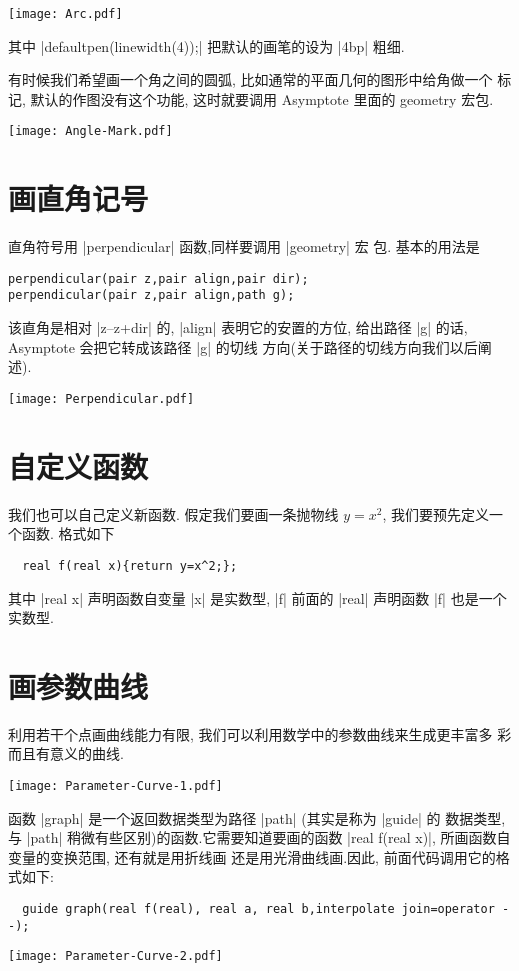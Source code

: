 \documentclass{ctexbook}
\begin{document}
\begin{center}\texttt{[image: Arc.pdf]}\end{center}%


其中 |defaultpen(linewidth(4));| 把默认的画笔的设为 |4bp| 粗细.

有时候我们希望画一个角之间的圆弧, 比如通常的平面几何的图形中给角做一个
标记, 默认的作图没有这个功能, 这时就要调用 Asymptote 里面的 geometry 宏包. 
\begin{center}\texttt{[image: Angle-Mark.pdf]}\end{center}%


\section{画直角记号}
直角符号用 |perpendicular| 函数,同样要调用 |geometry| 宏
包. 基本的用法是
\begin{verbatim}
perpendicular(pair z,pair align,pair dir);
perpendicular(pair z,pair align,path g);
\end{verbatim}
该直角是相对 |z--z+dir| 的, |align| 表明它的安置的方位,
给出路径 |g| 的话, Asymptote 会把它转成该路径 |g| 的切线
方向(关于路径的切线方向我们以后阐述).
\begin{center}\texttt{[image: Perpendicular.pdf]}\end{center}%


\section{自定义函数}
我们也可以自己定义新函数. 假定我们要画一条抛物线 $y=x^{2}$, 我们要预先定义一个函数. 格式如下
\begin{lstlisting}
  real f(real x){return y=x^2;};
\end{lstlisting}
其中 |real x| 声明函数自变量 |x| 是实数型, |f| 前面的
|real| 声明函数 |f| 也是一个实数型. 

\section{画参数曲线}
利用若干个点画曲线能力有限, 我们可以利用数学中的参数曲线来生成更丰富多
彩而且有意义的曲线.
\begin{center}\texttt{[image: Parameter-Curve-1.pdf]}\end{center}%


函数 |graph| 是一个返回数据类型为路径 |path| (其实是称为 |guide| 的
数据类型, 与 |path| 稍微有些区别)的函数.它需要知道要画的函数
|real f(real x)|,  所画函数自变量的变换范围, 还有就是用折线画
还是用光滑曲线画.因此, 前面代码调用它的格式如下:
\begin{lstlisting}
  guide graph(real f(real), real a, real b,interpolate join=operator --);
\end{lstlisting}
\begin{center}\texttt{[image: Parameter-Curve-2.pdf]}\end{center}%

\end{document}
